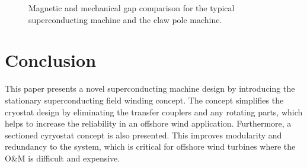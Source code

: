 \documentclass[12pt]{iopart}
\begin{document}
\begin{figure}[]
  \centering
  \hspace{0.5in}
    \caption{Magnetic and mechanical gap comparison for the typical superconducting machine and the claw pole machine.} 
    \label{magnetic_mechanical_gap}
\end{figure}


\section{Conclusion}

This paper presents a novel superconducting machine design by introducing the stationary superconducting field winding concept. The concept simplifies the cryostat design by eliminating the transfer couplers and any rotating parts, which helps to increase the reliability in an offshore wind application. Furthermore, a sectioned cyryostat concept is also presented. This improves modularity and redundancy to the system, which is critical for offshore wind turbines where the O\&M is difficult and expensive.
\end{document}

